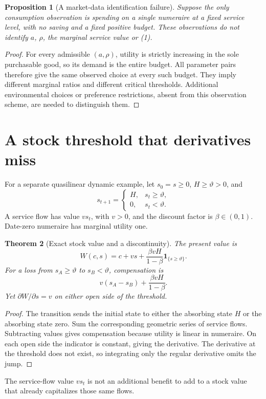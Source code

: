 \documentclass[11pt,a4paper]{article}
\newtheorem{theorem}{Theorem}[section]
\newtheorem{proposition}[theorem]{Proposition}
\theoremstyle{definition}
\theoremstyle{remark}
\newcommand{\ind}{\mathbf{1}}
\begin{document}
\begin{proposition}[A market-data identification failure]
Suppose the only consumption observation is spending on a single numeraire at a fixed service level, with no saving and a fixed positive budget. These observations do not identify $a$, $\rho$, the marginal service value or (1).
\end{proposition}
\begin{proof}
For every admissible $(a,\rho)$, utility is strictly increasing in the sole purchasable good, so its demand is the entire budget. All parameter pairs therefore give the same observed choice at every such budget. They imply different marginal ratios and different critical thresholds. Additional environmental choices or preference restrictions, absent from this observation scheme, are needed to distinguish them.
\end{proof}

\section{A stock threshold that derivatives miss}
For a separate quasilinear dynamic example, let $s_0=s\geq0$, $H\geq\vartheta>0$, and
\[
 s_{t+1}=\begin{cases}H,&s_t\geq\vartheta,\\0,&s_t<\vartheta.\end{cases}
\]
A service flow has value $v s_t$, with $v>0$, and the discount factor is $\beta\in(0,1)$. Date-zero numeraire has marginal utility one.

\begin{theorem}[Exact stock value and a discontinuity]
The present value is
\[
 W(c,s)=c+vs+\frac{\beta vH}{1-\beta}\ind_{\{s\geq\vartheta\}}.
\]
For a loss from $s_A\geq\vartheta$ to $s_B<\vartheta$, compensation is
\[
 v(s_A-s_B)+\frac{\beta vH}{1-\beta}.
\]
Yet $\partial W/\partial s=v$ on either open side of the threshold.
\end{theorem}
\begin{proof}
The transition sends the initial state to either the absorbing state $H$ or the absorbing state zero. Sum the corresponding geometric series of service flows. Subtracting values gives compensation because utility is linear in numeraire. On each open side the indicator is constant, giving the derivative. The derivative at the threshold does not exist, so integrating only the regular derivative omits the jump.
\end{proof}

The service-flow value $vs_t$ is not an additional benefit to add to a stock value that already capitalizes those same flows.
\end{document}
